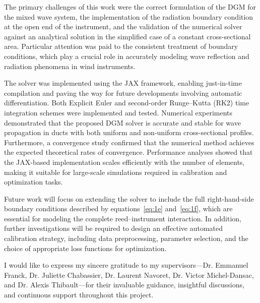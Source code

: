 \documentclass[11pt,a4paper]{report}
\theoremstyle{plain}
\theoremstyle{definition}
\begin{document}
The primary challenges of this work were the correct formulation of the DGM for the mixed wave system, the implementation of the radiation 
boundary condition at the open end of the instrument, and the validation of the numerical solver against an analytical solution in the 
simplified case of a constant cross-sectional area. Particular attention was paid to the consistent treatment of boundary conditions, which 
play a crucial role in accurately modeling wave reflection and radiation phenomena in wind instruments.

The solver was implemented using the JAX framework, enabling just-in-time compilation and paving the way for future developments involving 
automatic differentiation. Both Explicit Euler and second-order Runge–Kutta (RK2) time integration schemes were implemented and tested. 
Numerical experiments demonstrated that the proposed DGM solver is accurate and stable for wave propagation in ducts with both uniform and 
non-uniform cross-sectional profiles. Furthermore, a convergence study confirmed that the numerical method achieves the expected theoretical 
rates of convergence. Performance analyses showed that the JAX-based implementation scales efficiently with the number of elements, making 
it suitable for large-scale simulations required in calibration and optimization tasks.

Future work will focus on extending the solver to include the full right-hand-side boundary conditions described by equations~\eqref{eq:1e} 
and~\eqref{eq:1f}, which are essential for modeling the complete reed–instrument interaction. In addition, further investigations will be 
required to design an effective automated calibration strategy, including data preprocessing, parameter selection, and the choice of 
appropriate loss functions for optimization.

I would like to express my sincere gratitude to my supervisors—Dr. Emmanuel Franck, Dr. Juliette Chabassier, Dr. Laurent Navoret, Dr. Victor
 Michel-Dansac, and Dr. Alexis Thibault—for their invaluable guidance, insightful discussions, and continuous support throughout this project.

\newpage
\printbibliography

%
\end{document}
